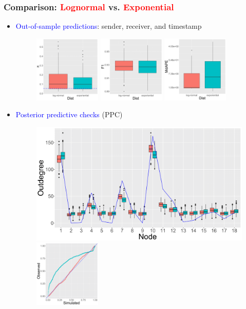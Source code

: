 \documentclass{beamer}
\begin{document}
							
				\begin{frame}
					\frametitle{Comparison: \textcolor{red}{Lognormal} vs. \textcolor{red}{Exponential}}
					\begin{itemize}
						\item \textcolor{blue}{Out-of-sample predictions}: sender, receiver, and timestamp 
							\begin{figure}[!t]
								\centering
										\includegraphics[width=0.3\textwidth]{senderpredict-1.png}	
										\includegraphics[width=0.3\textwidth]{receiverpredict-1.png}	
										\includegraphics[width=0.3\textwidth]{timepredict-1.png}
							\end{figure}		
							
						\item \textcolor{blue}{Posterior predictive checks} (PPC)
							\begin{figure}[t]
								\centering
										\includegraphics[width=.54\textwidth]{outdegree2-1.png}	
										\includegraphics[width=0.3\textwidth]{timePPplot2-1.png}
							\end{figure}
							

\end{itemize}
\end{frame}
\end{document}
